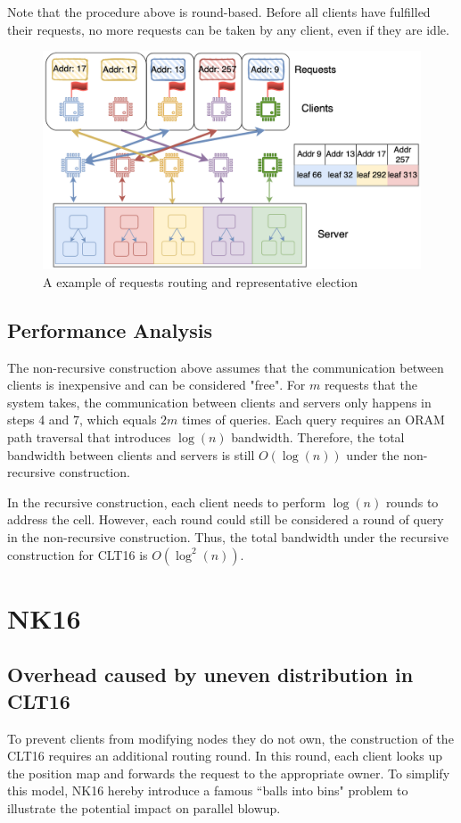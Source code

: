 \documentclass[fontsize=11pt]{article}
\begin{document}
Note that the procedure above is round-based. Before all clients have fulfilled their requests, no more requests can be taken by any client, even if they are idle.
\begin{figure}
    \centering
    \includegraphics[width=1\linewidth]{pics/route_requests.png}
    \caption{A example of requests routing and representative election}
    \label{fig:routing-requests}
\end{figure}
\subsection{Performance Analysis}
The non-recursive construction above assumes that the communication between clients is inexpensive and can be considered "free". For $m$ requests that the system takes, the communication between clients and servers only happens in steps 4 and 7, which equals $2m$ times of queries. Each query requires an ORAM path traversal that introduces $\log(n)$ bandwidth. Therefore, the total bandwidth between clients and servers is still $O(\log(n))$ under the non-recursive construction.

In the recursive construction, each client needs to perform $\log(n)$ rounds to address the cell. However, each round could still be considered a round of query in the non-recursive construction. Thus, the total bandwidth under the recursive construction for CLT16 is $O(\log^2(n))$.
\section{NK16}
\subsection{Overhead caused by uneven distribution in CLT16}
To prevent clients from modifying nodes they do not own, the construction of the CLT16 requires an additional routing round. In this round, each client looks up the position map and forwards the request to the appropriate owner. To simplify this model, NK16 hereby introduce a famous ``balls into bins" problem to illustrate the potential impact on parallel blowup.
\end{document}
